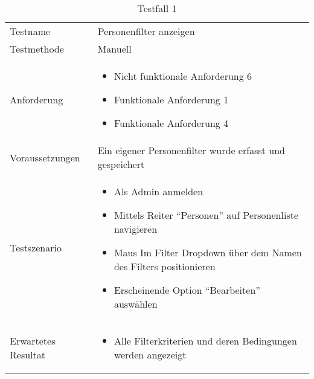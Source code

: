 \begin{table}[h!]
   \begin{tabular}{|L{0.4\textwidth}|L{0.6\textwidth}|}
       \hline
         \\[12pt]
       \hline
        Testname & Personenfilter anzeigen \\
       \hline
       Testmethode & Manuell \\
       \hline
        Anforderung & \begin{itemize}
         \item Nicht funktionale Anforderung 6
         \item Funktionale Anforderung 1
         \item Funktionale Anforderung 4
         \end{itemize}  \\
       \hline
       Voraussetzungen & Ein eigener Personenfilter wurde erfasst und gespeichert \\
       \hline
       Testszenario & 
       \begin{itemize}
         \item Als Admin anmelden
         \item Mittels Reiter ``Personen'' auf Personenliste navigieren
         \item Maus Im Filter Dropdown über dem Namen des Filters positionieren
         \item Erscheinende Option ``Bearbeiten'' auswählen
       \end{itemize} \\
       \hline
       Erwartetes Resultat & 
       \begin{itemize}
         \item Alle Filterkriterien und deren Bedingungen werden angezeigt
      \end{itemize} \\
      \hline
     \end{tabular}
     \caption{Testfall 1}
\end{table}

\newpage

